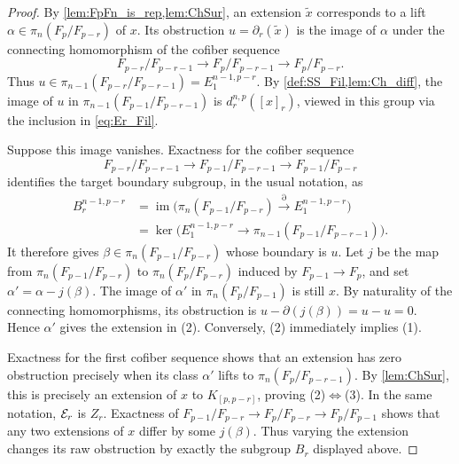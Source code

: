 \begin{proof}
    By \cref{lem:FpFn_is_rep,lem:ChSur}, an extension $\widetilde x$
    corresponds to a lift $\alpha\in\pi_n(F_p/F_{p-r})$ of $x$. Its
    obstruction $u=\partial_r(\widetilde x)$ is the image of $\alpha$
    under the connecting homomorphism of the cofiber sequence
    \[
        F_{p-r}/F_{p-r-1}\longrightarrow F_p/F_{p-r-1}
        \longrightarrow F_p/F_{p-r}.
    \]
    Thus $u\in\pi_{n-1}(F_{p-r}/F_{p-r-1})=E_1^{n-1,p-r}$.
    By \cref{def:SS_Fil,lem:Ch_diff}, the image of $u$ in
    $\pi_{n-1}(F_{p-1}/F_{p-r-1})$ is $d_r^{n,p}([x]_r)$, viewed in
    this group via the inclusion in \cref{eq:Er_Fil}.

    Suppose this image vanishes. Exactness for the cofiber sequence
    \[
        F_{p-r}/F_{p-r-1}\longrightarrow F_{p-1}/F_{p-r-1}
        \longrightarrow F_{p-1}/F_{p-r}
    \]
    identifies the target boundary subgroup, in the usual notation, as
    \[
        \begin{aligned}
            B_r^{n-1,p-r}
            &=\operatorname{im}\bigl(\pi_n(F_{p-1}/F_{p-r})
              \xrightarrow{\partial} E_1^{n-1,p-r}\bigr)\\
            &=\ker\bigl(E_1^{n-1,p-r}\to
              \pi_{n-1}(F_{p-1}/F_{p-r-1})\bigr).
        \end{aligned}
    \]
    It therefore gives $\beta\in\pi_n(F_{p-1}/F_{p-r})$ whose
    boundary is $u$.
    Let $j$ be the map from $\pi_n(F_{p-1}/F_{p-r})$ to
    $\pi_n(F_p/F_{p-r})$ induced by $F_{p-1}\to F_p$, and set
    $\alpha'=\alpha-j(\beta)$. The image of
    $\alpha'$ in $\pi_n(F_p/F_{p-1})$ is still $x$. By naturality of
    the connecting homomorphisms, its obstruction is
    $u-\partial(j(\beta))=u-u=0$. Hence $\alpha'$ gives the
    extension in (2). Conversely, (2) immediately implies (1).

    Exactness for the first cofiber sequence shows that an extension
    has zero obstruction precisely when its class $\alpha'$ lifts to
    $\pi_n(F_p/F_{p-r-1})$. By \cref{lem:ChSur}, this is precisely an
    extension of $x$ to $K_{[p,p-r]}$, proving (2)$\Leftrightarrow$(3).
    In the same notation, $\mathcal{E}_r$ is $Z_r$. Exactness of
    $F_{p-1}/F_{p-r}\to F_p/F_{p-r}\to F_p/F_{p-1}$ shows that any
    two extensions of $x$ differ by some $j(\beta)$. Thus varying
    the extension changes its raw obstruction by exactly the subgroup
    $B_r$ displayed above.
\end{proof}
